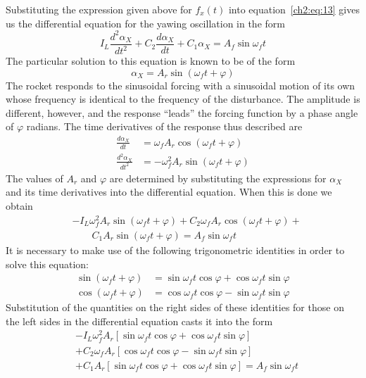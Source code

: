 Substituting the expression given above for $f_x(t)$ into
equation~\eqref{ch2:eq:13} gives us the differential equation for the yawing
oscillation in the form
\begin{equation*}
I_L\frac{d^{2}\alpha_X}{dt^{2}} + C_2\frac{d\alpha_X}{dt} + C_1\alpha_X
= A_f\sin\omega_f t
\end{equation*}
The particular solution to this equation is known to be of the form
\begin{equation}\label{ch2:eq:44}
\alpha_X = A_r\sin(\omega_f t + \varphi)
\end{equation}
The rocket responds to the sinusoidal forcing with a sinusoidal motion of its
own whose frequency is identical to the frequency of the disturbance. The
amplitude is different, however, and the response ``leads'' the forcing
function by a phase angle of $\varphi$ radians. The time derivatives of the
response thus described are
\begin{align*}
\frac{d\alpha_X}{dt} &= \omega_f A_r\cos(\omega_f t + \varphi)\\
\frac{d^{2}\alpha_X}{dt^{2}} &= -\omega_f^{2} A_r\sin(\omega_f t + \varphi)
\end{align*}
The values of $A_r$ and $\varphi$ are determined by substituting the
expressions for $\alpha_X$ and its time derivatives into the differential
equation. When this is done we obtain
\begin{align*}
&{-}I_L\omega_f^{2}A_r\sin(\omega_f t + \varphi)
+ C_2\omega_f A_r\cos(\omega_f t + \varphi) + {}\\
&\qquad C_1 A_r\sin(\omega_f t + \varphi) = A_f\sin\omega_f t
\end{align*}
It is necessary to make use of the following trigonometric identities in order
to solve this equation:
\begin{align*}
\sin(\omega_f t + \varphi) &= \sin\omega_f t\cos\varphi + \cos\omega_f t\sin\varphi\\
\cos(\omega_f t + \varphi) &= \cos\omega_f t\cos\varphi - \sin\omega_f t\sin\varphi
\end{align*}
Substitution of the quantities on the right sides of these identities for
those on the left sides in the differential equation casts it into the form
\begin{align*}
&{-}I_L\omega_f^{2}A_r\left[\sin\omega_f t\cos\varphi + \cos\omega_f t\sin\varphi\right]\\
&+ C_2\omega_f A_r\left[\cos\omega_f t\cos\varphi - \sin\omega_f t\sin\varphi\right]\\
&+ C_1 A_r\left[\sin\omega_f t\cos\varphi + \cos\omega_f t\sin\varphi\right]
= A_f\sin\omega_f t
\end{align*}
